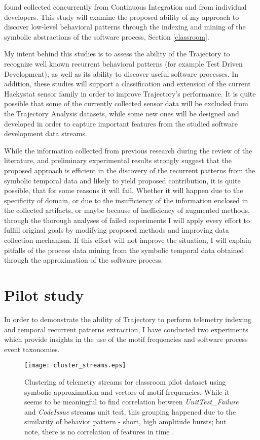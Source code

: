 found  collected concurrently from Continuous Integration and from individual developers. This study will examine the proposed ability of my approach to discover low-level behavioral patterns through the indexing and mining of the symbolic abstractions of the software process, Section \ref{classroom}. 

My intent behind this studies is to assess the ability of the Trajectory to recognize well known recurrent behavioral patterns (for example Test Driven Development), as well as its ability to discover useful software processes. In addition, these studies will support a classification and extension of the current Hackystat sensor family in order to improve Trajectory's performance. It is quite possible that some of the currently collected sensor data will be excluded from the Trajectory Analysis datasets, while some new ones will be designed and developed in order to capture important features from the studied software development data streams.

While the information collected from previous research during the review of the literature, and preliminary experimental results strongly suggest that the proposed approach is efficient in the discovery of the recurrent patterns from the symbolic temporal data and likely to yield proposed contribution, it is quite possible, that for some reasons it will fail. Whether it will happen due to the specificity of domain, or due to the insufficiency of the information enclosed in the collected artifacts, or maybe because of inefficiency of augmented methods, through the thorough analyses of failed experiments I will apply every effort to fulfill original goals by modifying proposed methods and improving data collection mechanism. If this effort will not improve the situation, I will explain pitfalls of the process data mining from the symbolic temporal data obtained through the approximation of the software process. 

\section{Pilot study}\label{pilot.evaluation}
In order to demonstrate the ability of Trajectory to perform telemetry indexing and temporal recurrent patterns extraction, I have conducted two experiments which provide insights in the use of the motif frequencies and software process event taxonomies. 

\begin{figure}[tbp]
   \centering
   \texttt{[image: cluster\_streams.eps]}
   \caption{Clustering of telemetry streams for classroom pilot dataset using symbolic approximation and vectors of motif frequencies. While it seems to be meaningful to find correlation between \textit{UnitTest\_Failure} and \textit{CodeIssue} streams unit test, this grouping happened due to the similarity of behavior pattern - short, high amplitude bursts; but note, there is no correlation of features in time .}
   \label{fig:cluster_streams}
\end{figure}

